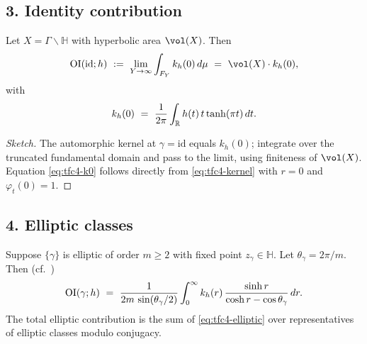 \subsection*{3. Identity contribution}\relax\hspace{0pt}
\label{subsec:tfc4-identity} %

\begin{proposition}\relax\hspace{0pt}
\label{prop:tfc4-id} %
Let $X=\Gamma\backslash\mathbb{H}$ with hyperbolic area $\vol(X)$. Then
\begin{equation}\relax\hspace{0pt}
\label{eq:tfc4-id}\relax\hspace{0pt}
\mathrm{OI}(\mathrm{id};h)\ :=\ \lim_{Y\to\infty}\int_{F_Y} k_h(0)\,d\mu\ =\ \vol(X)\cdot k_h(0),
\end{equation}
with
\begin{equation}\relax\hspace{0pt}
\label{eq:tfc4-k0}\relax\hspace{0pt}
k_h(0)\ =\ \frac{1}{2\pi}\int_{\mathbb{R}} h(t)\,t\tanh(\pi t)\,dt.
\end{equation}
\end{proposition}

\begin{proof}[Sketch]\relax\hspace{0pt}
The automorphic kernel at $\gamma=\mathrm{id}$ equals $k_h(0)$; integrate over the truncated fundamental domain and pass to the limit, using finiteness of $\vol(X)$. \relax\hspace{0pt}
Equation \eqref{eq:tfc4-k0} follows directly from \eqref{eq:tfc4-kernel} with $r=0$ and $\varphi_t(0)=1$.\relax\hspace{0pt}
\end{proof}

\subsection*{4. Elliptic classes}\relax\hspace{0pt}
\label{subsec:tfc4-elliptic} %

Suppose $\{\gamma\}$ is elliptic of order $m\ge 2$ with fixed point $z_\gamma\in\mathbb{H}$. \relax\hspace{0pt}
Let $\theta_\gamma=2\pi/m$. \relax\hspace{0pt}
Then (cf.\ \cite{HejhalI,HejhalII})
\begin{equation}\relax\hspace{0pt}
\label{eq:tfc4-elliptic}\relax\hspace{0pt}
\mathrm{OI}(\gamma;h)\ =\ \frac{1}{2m\,\sin(\theta_\gamma/2)} \int_{0}^{\infty} k_h(r)\, \frac{\sinh r}{\cosh r-\cos\theta_\gamma}\,dr.
\end{equation}
The total elliptic contribution is the sum of \eqref{eq:tfc4-elliptic} over representatives of elliptic classes modulo conjugacy. \relax\hspace{0pt}

